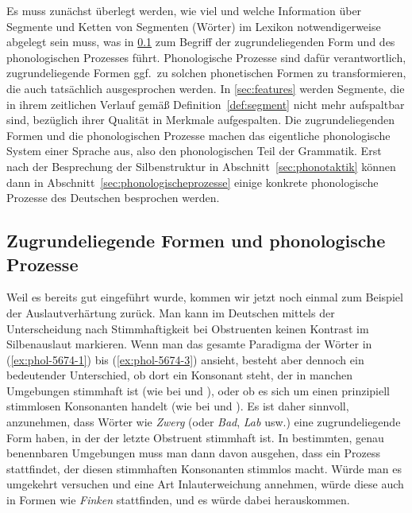 \label{sec:pholfeat}

Es muss zunächst überlegt werden, wie viel und welche Information über Segmente und Ketten von Segmenten (\zB Wörter) im Lexikon notwendigerweise abgelegt sein muss, was in \ref{sec:ur} zum Begriff der zugrundeliegenden Form und des phonologischen Prozesses führt.
Phonologische Prozesse sind dafür verantwortlich, zugrundeliegende Formen ggf.\ zu solchen phonetischen Formen zu transformieren, die auch tatsächlich ausgesprochen werden.
In \ref{sec:features} werden Segmente, die in ihrem zeitlichen Verlauf gemäß Definition~\ref{def:segment} nicht mehr aufspaltbar sind, bezüglich ihrer Qualität in Merkmale aufgespalten.
Die zugrundeliegenden Formen und die phonologischen Prozesse machen das eigentliche phonologische System einer Sprache aus, also den phonologischen Teil der Grammatik.
Erst nach der Besprechung der Silbenstruktur in Abschnitt~\ref{sec:phonotaktik} können dann in Abschnitt~\ref{sec:phonologischeprozesse} einige konkrete phonologische Prozesse des Deutschen besprochen werden.

\subsection{Zugrundeliegende Formen und phonologische Prozesse}

\label{sec:ur}

Weil es bereits gut eingeführt wurde, kommen wir jetzt noch einmal zum Beispiel der Auslautverhärtung zurück.
Man kann im Deutschen mittels der Unterscheidung nach Stimmhaftigkeit bei Obstruenten keinen Kontrast im Silbenauslaut markieren.
Wenn man das gesamte Paradigma der Wörter in (\ref{ex:phol-5674-1}) bis (\ref{ex:phol-5674-3}) ansieht, besteht aber dennoch ein bedeutender Unterschied, ob dort ein Konsonant steht, der in manchen Umgebungen stimmhaft ist (wie bei \textipa{[\t{ts}v\t{E@}k]} und \textipa{[\t{ts}v\t{E@}g@s]}), oder ob es sich um einen prinzipiell stimmlosen Konsonanten handelt (wie bei \textipa{[fINk]} und \textipa{[fINk@n]}).
Es ist daher sinnvoll, anzunehmen, dass Wörter wie \textit{Zwerg} (oder \textit{Bad}, \textit{Lab} usw.) eine zugrundeliegende Form haben, in der der letzte Obstruent stimmhaft ist.
In bestimmten, genau benennbaren Umgebungen muss man dann davon ausgehen, dass ein Prozess stattfindet, der diesen stimmhaften Konsonanten stimmlos macht.
Würde man es umgekehrt versuchen und eine Art Inlauterweichung annehmen, würde diese auch in Formen wie \textit{Finken} stattfinden, und es würde \Ast\textipa{[fIN@n]} dabei herauskommen.

